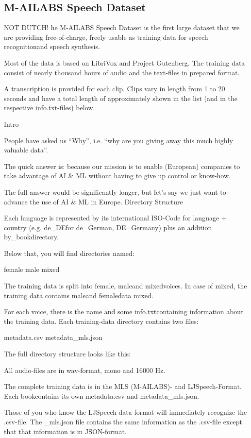 \subsection{M-AILABS Speech Dataset}
NOT DUTCH!
he M-AILABS Speech Dataset is the first large dataset that we are providing free-of-charge, freely usable as training data for speech recognitionand speech synthesis.

Most of the data is based on LibriVox and Project Gutenberg. The training data consist of nearly thousand hours of audio and the text-files in prepared format.

A transcription is provided for each clip. Clips vary in length from 1 to 20 seconds and have a total length of approximately shown in the list (and in the respective info.txt-files) below.

Intro

People have asked us “Why”, i.e. “why are you giving away this much highly valuable data”.

The quick answer is: because our mission is to enable (European) companies to take advantage of AI & ML without having to give up control or know-how.

The full answer would be significantly longer, but let’s say we just want to advance the use of AI & ML in Europe.
Directory Structure

Each language is represented by its international ISO-Code for language + country (e.g. de_DEfor de=German, DE=Germany) plus an addition by_bookdirectory.

Below that, you will find directories named:

    female
    male
    mixed

The training data is split into female, maleand mixedvoices. In case of mixed, the training data contains maleand femaledata mixed.

For each voice, there is the name and some info.txtcontaining information about the training data. Each training-data directory contains two files:

    metadata.csv
    metadata_mls.json

The full directory structure looks like this:

All audio-files are in wav-format, mono and 16000 Hz.

The complete training data is in the MLS (M-AILABS)- and LJSpeech-Format. Each bookcontains its own metadata.csv and metadata_mls.json.

Those of you who know the LJSpeech data format will immediately recognize the .csv-file. The _mls.json file contains the same information as the .csv-file except that that information is in JSON-format.

